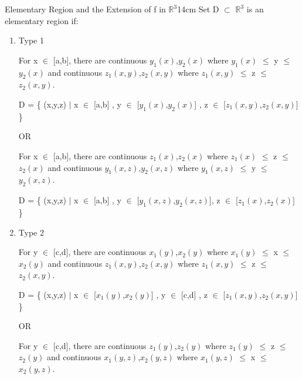     \newpage




    \begin{definition}{Elementary Region and the Extension of f
    in $\mathbb{R}^3$}{14cm}
        Set D $\subset$ $\mathbb{R}^3$ is an elementary region if:

        \begin{enumerate}[label=(\alph*), leftmargin=1cm, itemsep=0.1cm]
            \item {\color{red} Type 1}

                For x $\in$ [a,b], there are continuous $y_1(x)$,$y_2(x)$ where
                $y_1(x)$ $\leq$ y $\leq$ $y_2(x)$
                and continuous $z_1(x,y)$,$z_2(x,y)$ where
                $z_1(x,y)$ $\leq$ z $\leq$ $z_2(x,y)$.

                \hspace{0.5cm}
                D = \{ (x,y,z) $|$ x $\in$ [a,b] , y $\in$ [$y_1(x)$,$y_2(x)$] ,
                                z $\in$ [$z_1(x,y)$,$z_2(x,y)$] \}

                OR

                For x $\in$ [a,b], there are continuous $z_1(x)$,$z_2(x)$ where
                $z_1(x)$ $\leq$ z $\leq$ $z_2(x)$
                and continuous $y_1(x,z)$,$y_2(x,z)$ where
                $y_1(x,z)$ $\leq$ y $\leq$ $y_2(x,z)$.

                \hspace{0.5cm}
                D = \{ (x,y,z) $|$ x $\in$ [a,b] , y $\in$ [$y_1(x,z)$,$y_2(x,z)$],
                                    z $\in$ [$z_1(x)$,$z_2(x)$] \}

            \item {\color{red} Type 2}

                For y $\in$ [c,d], there are continuous $x_1(y)$,$x_2(y)$ where
                $x_1(y)$ $\leq$ x $\leq$ $x_2(y)$
                and continuous $z_1(x,y)$,$z_2(x,y)$ where
                $z_1(x,y)$ $\leq$ z $\leq$ $z_2(x,y)$.

                \hspace{0.5cm}
                D = \{ (x,y,z) $|$ x $\in$ [$x_1(y)$,$x_2(y)$] , y $\in$ [c,d] ,
                                z $\in$ [$z_1(x,y)$,$z_2(x,y)$] \}

                OR

                For y $\in$ [c,d], there are continuous $z_1(y)$,$z_2(y)$ where
                $z_1(y)$ $\leq$ z $\leq$ $z_2(y)$
                and continuous $x_1(y,z)$,$x_2(y,z)$ where
                $x_1(y,z)$ $\leq$ x $\leq$ $x_2(y,z)$.


\end{enumerate}
\end{definition}
